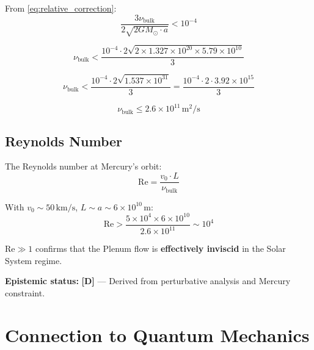 \documentclass[12pt,a4paper,openany]{book}
\theoremstyle{definition}
\theoremstyle{plain}
\theoremstyle{remark}
\newcommand{\nubulk}{\nu_{\text{bulk}}}    %
\newcommand{\derived}{\textcolor{derivedcolor}{\textbf{[D]}}}
\begin{document}
From \cref{eq:relative_correction}:
\begin{equation}
\frac{3\nubulk}{2\sqrt{2GM_\odot \cdot a}} < 10^{-4}
\end{equation}

\begin{equation}
\nubulk < \frac{10^{-4} \cdot 2\sqrt{2 \times 1.327 \times 10^{20} \times 5.79 \times 10^{10}}}{3}
\end{equation}

\begin{equation}
\nubulk < \frac{10^{-4} \cdot 2\sqrt{1.537 \times 10^{31}}}{3} = \frac{10^{-4} \cdot 2 \cdot 3.92 \times 10^{15}}{3}
\end{equation}

\begin{derivedbox}
\begin{equation}
\boxed{\nubulk \leq 2.6 \times 10^{11}\,\text{m}^2/\text{s}}
\label{eq:nu_bound}
\end{equation}
\end{derivedbox}

\section{Reynolds Number}

The Reynolds number at Mercury's orbit:
\begin{equation}
\text{Re} = \frac{v_0 \cdot L}{\nubulk}
\end{equation}

With $v_0 \sim 50\,\text{km/s}$, $L \sim a \sim 6 \times 10^{10}\,\text{m}$:
\begin{equation}
\text{Re} > \frac{5 \times 10^4 \times 6 \times 10^{10}}{2.6 \times 10^{11}} \sim 10^4
\end{equation}

\begin{derivedbox}
$\text{Re} \gg 1$ confirms that the Plenum flow is \textbf{effectively inviscid} in the Solar System regime.
\end{derivedbox}

\textbf{Epistemic status:} \derived{} — Derived from perturbative analysis and Mercury constraint.

\chapter{Connection to Quantum Mechanics}
\end{document}

